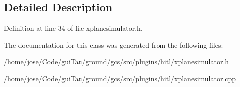 \subsection{Detailed Description}


Definition at line 34 of file xplanesimulator.\-h.



The documentation for this class was generated from the following files\-:\begin{DoxyCompactItemize}
\item 
/home/jose/\-Code/gui\-Tau/ground/gcs/src/plugins/hitl/\hyperlink{xplanesimulator_8h}{xplanesimulator.\-h}\item 
/home/jose/\-Code/gui\-Tau/ground/gcs/src/plugins/hitl/\hyperlink{xplanesimulator_8cpp}{xplanesimulator.\-cpp}\end{DoxyCompactItemize}
